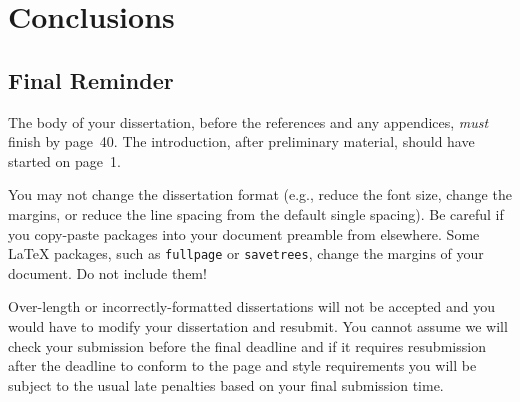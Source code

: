 \documentclass[main.tex]{subfiles}
\begin{document}
\chapter{Conclusions}

    \section{Final Reminder}

        The body of your dissertation, before the references and any appendices,
            \emph{must} finish by page~40.
        The introduction, after preliminary material, should have started on page~1.

        You may not change the dissertation format (e.g., reduce the font size, change
            the margins, or reduce the line spacing from the default single spacing).
        Be careful if you copy-paste packages into your document preamble from
            elsewhere.
        Some \LaTeX{} packages, such as \texttt{fullpage} or \texttt{savetrees}, change
            the margins of your document.
        Do not include them!

        Over-length or incorrectly-formatted dissertations will not be accepted and you
            would have to modify your dissertation and resubmit.
        You cannot assume we will check your submission before the final deadline and
            if it requires resubmission after the deadline to conform to the page and style
            requirements you will be subject to the usual late penalties based on your
            final submission time.
\end{document}
